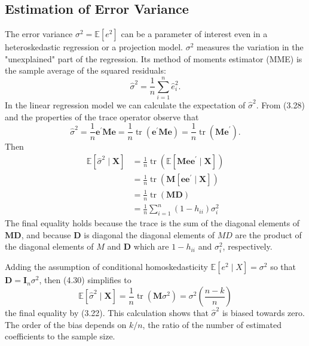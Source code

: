 \documentclass[10pt]{article}
\begin{document}
\subsection{Estimation of Error Variance}
The error variance $\sigma^{2}=\mathbb{E}\left[e^{2}\right]$ can be a parameter of interest even in a heteroskedastic regression or a projection model. $\sigma^{2}$ measures the variation in the "unexplained" part of the regression. Its method of moments estimator (MME) is the sample average of the squared residuals:
$$
\widehat{\sigma}^{2}=\frac{1}{n} \sum_{i=1}^{n} \widehat{e}_{i}^{2} .
$$
In the linear regression model we can calculate the expectation of $\widehat{\sigma}^{2}$. From (3.28) and the properties of the trace operator observe that
$$
\widehat{\sigma}^{2}=\frac{1}{n} \boldsymbol{e}^{\prime} \boldsymbol{M} \boldsymbol{e}=\frac{1}{n} \operatorname{tr}\left(\boldsymbol{e}^{\prime} \boldsymbol{M} \boldsymbol{e}\right)=\frac{1}{n} \operatorname{tr}\left(\boldsymbol{M e}^{\prime}\right) .
$$
Then
$$
\begin{aligned}
\mathbb{E}\left[\widehat{\sigma}^{2} \mid \boldsymbol{X}\right] &=\frac{1}{n} \operatorname{tr}\left(\mathbb{E}\left[\boldsymbol{M e e}^{\prime} \mid \boldsymbol{X}\right]\right) \\
&=\frac{1}{n} \operatorname{tr}\left(\boldsymbol{M}\left[\boldsymbol{e} \boldsymbol{e}^{\prime} \mid \boldsymbol{X}\right]\right) \\
&=\frac{1}{n} \operatorname{tr}(\boldsymbol{M D}) \\
&=\frac{1}{n} \sum_{i=1}^{n}\left(1-h_{i i}\right) \sigma_{i}^{2}
\end{aligned}
$$
The final equality holds because the trace is the sum of the diagonal elements of $\boldsymbol{M D}$, and because $\boldsymbol{D}$ is diagonal the diagonal elements of $M D$ are the product of the diagonal elements of $M$ and $\boldsymbol{D}$ which are $1-h_{i i}$ and $\sigma_{i}^{2}$, respectively.

Adding the assumption of conditional homoskedasticity $\mathbb{E}\left[e^{2} \mid X\right]=\sigma^{2}$ so that $\boldsymbol{D}=\boldsymbol{I}_{n} \sigma^{2}$, then (4.30) simplifies to
$$
\mathbb{E}\left[\widehat{\sigma}^{2} \mid \boldsymbol{X}\right]=\frac{1}{n} \operatorname{tr}\left(\boldsymbol{M} \sigma^{2}\right)=\sigma^{2}\left(\frac{n-k}{n}\right)
$$
the final equality by (3.22). This calculation shows that $\widehat{\sigma}^{2}$ is biased towards zero. The order of the bias depends on $k / n$, the ratio of the number of estimated coefficients to the sample size.
\end{document}
